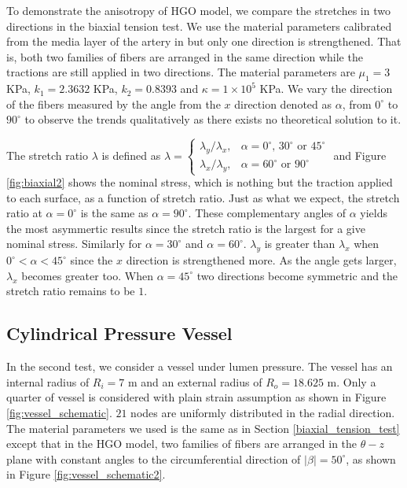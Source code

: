 To demonstrate the anisotropy of HGO model, we compare the stretches in two directions in the biaxial tension test. We use the material parameters calibrated from the media layer of the artery in \cite{Holzapfel2} but only one direction is strengthened. That is, both two families of fibers are arranged in the same direction while the tractions are still applied in two directions. The material parameters are $\mu_1 = 3$ KPa, $k_1 = 2.3632$ KPa, $k_2 = 0.8393$ and $\kappa = 1 \times 10^5$ KPa. We vary the direction of the fibers measured by the angle from the $x$ direction denoted as $\alpha$, from $0^\circ$ to $90^\circ$ to observe the trends qualitatively as there exists no theoretical solution to it. 

The stretch ratio $\lambda$ is defined as $\lambda = 
\begin{cases}
	\lambda_y/\lambda_x, & \text{$\alpha = 0^\circ$, $30^\circ$ or $45^\circ$} \\
	\lambda_x/\lambda_y, & \text{$\alpha = 60^\circ$ or $90^\circ$}
\end{cases}
$ 
and Figure \ref{fig:biaxial2} shows the nominal stress, which is nothing but the traction applied to each surface, as a function of stretch ratio. Just as what we expect, the stretch ratio at $\alpha = 0^\circ$ is the same as $\alpha = 90^\circ$. These complementary angles of $\alpha$ yields the most asymmertic results since the stretch ratio is the largest for a give nominal stress. Similarly for $\alpha = 30^\circ$ and $\alpha = 60^\circ$. 
$\lambda_y$ is greater than $\lambda_x$ when $0^\circ < \alpha < 45^\circ$ since the $x$ direction is strengthened more. As the angle gets larger, $\lambda_x$ becomes greater too. When $\alpha = 45^\circ$ two directions become symmetric and the stretch ratio remains to be $1$.
 

\subsection{Cylindrical Pressure Vessel}
\label{pressure_vessel}
In the second test, we consider a vessel under lumen pressure. The vessel has an internal radius of $R_i = 7$ m and an external radius of $R_o = 18.625$ m. Only a quarter of vessel is considered with plain strain assumption as shown in Figure \ref{fig:vessel_schematic}. $21$ nodes are uniformly distributed in the radial direction. The material parameters we used is the same as in Section \ref{biaxial_tension_test} except that in the HGO model, two families of fibers are arranged in the $\theta-z$ plane with constant angles to the circumferential direction of $|\beta| = 50^\circ$, as shown in Figure \ref{fig:vessel_schematic2}.

